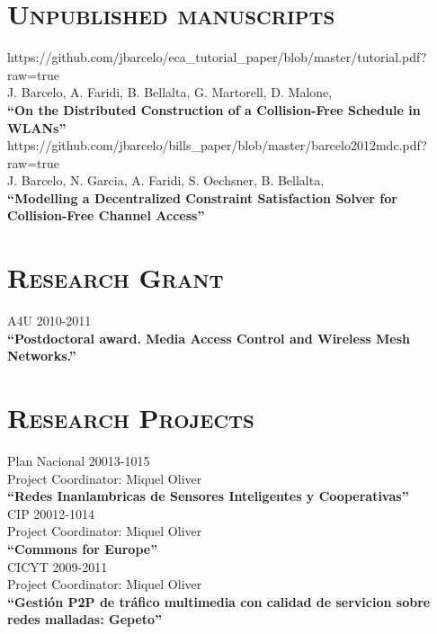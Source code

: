 \documentclass[line,margin]{res}
\begin{document}
\begin{resume}
\section{\textsc{Unpublished manuscripts}}
\hfill {https://github.com/jbarcelo/eca\_tutorial\_paper/blob/master/tutorial.pdf?raw=true} \\
J. Barcelo, A. Faridi, B. Bellalta, G. Martorell, D. Malone, \\
\textbf{``On the Distributed Construction of a Collision-Free Schedule in WLANs''}\\

\hfill {https://github.com/jbarcelo/bills\_paper/blob/master/barcelo2012mdc.pdf?raw=true} \\
J. Barcelo, N. Garcia, A. Faridi, S. Oechsner, B. Bellalta, \\
\textbf{``Modelling a Decentralized Constraint Satisfaction Solver for Collision-Free Channel Access''}\\

\newpage
\section{\textsc{Research Grant}}

\hfill {A4U 2010-2011} \\
\textbf{``Postdoctoral award. Media Access Control and Wireless Mesh Networks.''}\\

\section{\textsc{Research Projects}}

\hfill {Plan Nacional 20013-1015} \\
Project Coordinator: Miquel Oliver\\
\textbf{``Redes Inanlambricas de Sensores Inteligentes y Cooperativas''}\\

\hfill {CIP 20012-1014} \\
Project Coordinator: Miquel Oliver\\
\textbf{``Commons for Europe''}\\

\hfill {CICYT 2009-2011} \\
Project Coordinator: Miquel Oliver\\
\textbf{``Gestión P2P de tráfico multimedia con calidad de servicion sobre redes malladas: Gepeto''}\\


\end{resume}
\end{document}
